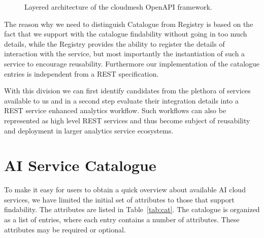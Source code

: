 \documentclass[12pt]{article}
\begin{document}
\begin{figure}[htb]
\begin{center}
\end{center}
\vspace{-12pt}
\caption{Layered architecture of the cloudmesh Open\-API framework.}
\label{fig:1}
\end{figure}

The reason why we need to distinguish Catalogue from Registry is based on the fact that we support with the catalogue findability without going in too much details, while the Registry provides the ability to register the details of interaction with the service, but most importantly the instantiation of such a service to encourage reusability. Furthermore our implementation of the catalogue entries is independent from a REST specification.

With this division we can first identify candidates from the plethora of services available to us and in a second step evaluate their integration details into a REST service enhanced analytics workflow. Such workflows can also be represented as high level REST services and thus become subject of reusability and deployment in larger analytics service ecosystems. 


\section{AI Service Catalogue}

To make it easy for users to obtain a quick overview about available AI cloud services, we have limited the initial set of attributes to those that support findability. The attributes are listed in Table~\ref{tab:cat}. The catalogue is organized as a list of entries, where each entry contains a number of attributes. These attributes may be required or optional. 
\end{document}

